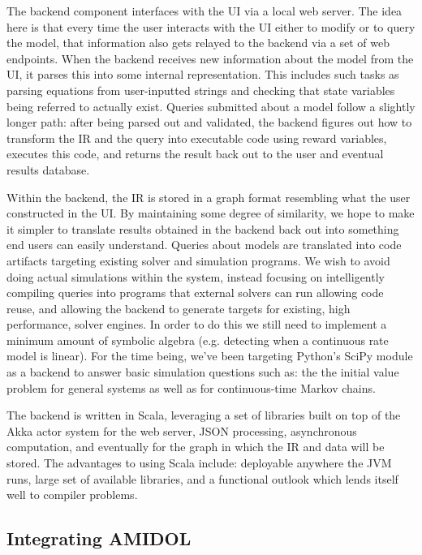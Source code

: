 \documentclass[11pt]{article}
\begin{document}
The backend component interfaces with the UI via a local web server. The idea here is that every time the user interacts with the UI either to modify or to query the model, that information also gets relayed to the backend via a set of web endpoints. When the backend receives new information about the model from the UI, it parses this into some internal representation. This includes such tasks as parsing equations from user-inputted strings and checking that state variables being referred to actually exist. Queries submitted about a model follow a slightly longer path: after being parsed out and validated, the backend figures out how to transform the IR and the query into executable code using reward variables, executes this code, and returns the result back out to the user and eventual results database.

Within the backend, the IR is stored in a graph format resembling what the user constructed in the UI. By maintaining some degree of similarity, we hope to make it simpler to translate results obtained in the backend back out into something end users can easily understand. Queries about models are translated into code artifacts targeting existing solver and simulation programs. We wish to avoid doing actual simulations within the system, instead focusing on intelligently compiling queries into programs that external solvers can run allowing code reuse, and allowing the backend to generate targets for existing, high performance, solver engines. In order to do this we still need to implement a minimum amount of symbolic algebra (e.g. detecting when a continuous rate  model is linear). For the time being, we’ve been targeting Python’s SciPy module as a backend to answer basic simulation questions such as: the the initial value problem for general systems as well as for continuous-time Markov chains.

The backend is written in Scala, leveraging a set of libraries built on top of the Akka actor system for the web server, JSON processing, asynchronous computation, and eventually for the graph in which the IR and data will be stored. The advantages to using Scala include: deployable anywhere the JVM runs, large set of available libraries, and a functional outlook which lends itself well to compiler problems.

\subsection{Integrating AMIDOL}
\end{document}
